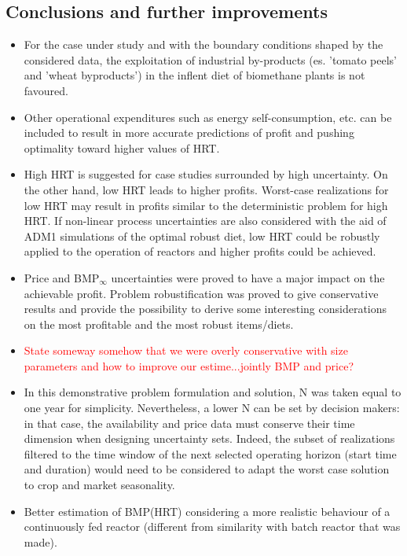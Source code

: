 
\subsection{Conclusions and further improvements}
\begin{itemize}
    \item For the case under study and with the boundary conditions shaped by the considered data, the exploitation of industrial by-products (es. 'tomato peels' and 'wheat byproducts') in the inflent diet of biomethane plants is not favoured.
    \item Other operational expenditures such as energy self-consumption, etc. can be included to result in more accurate predictions of profit and pushing optimality toward higher values of HRT.
    \item High HRT is suggested for case studies surrounded by high uncertainty. On the other hand, low HRT leads to higher profits. Worst-case realizations for low HRT may result in profits similar to the deterministic problem for high HRT. If non-linear process uncertainties are also considered with the aid of ADM1 simulations of the optimal robust diet, low HRT could be robustly applied to the operation of reactors and higher profits could be achieved.
    \item Price and BMP$_\infty$ uncertainties were proved to have a major impact on the achievable profit. Problem robustification was proved to give conservative results and provide the possibility to derive some interesting considerations on the most profitable and the most robust items/diets.
    \item \textcolor{red}{State someway somehow that we were overly conservative with size parameters and how to improve our estime...jointly BMP and price?}
    \item In this demonstrative problem formulation and solution, N was taken equal to one year for simplicity. Nevertheless, a lower N can be set by decision makers: in that case, the availability and price data must conserve their time dimension when designing uncertainty sets. Indeed, the subset of realizations filtered to the time window of the next selected operating horizon (start time and duration) would need to be considered to adapt the worst case solution to crop and market seasonality. 
    \item Better estimation of BMP(HRT) considering a more realistic behaviour of a continuously fed reactor (different from similarity with batch reactor that was made). 

\end{itemize}

